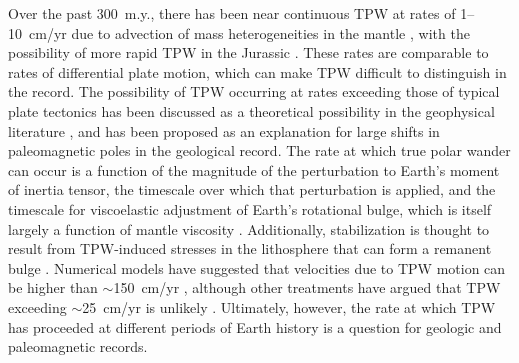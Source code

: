 Over the past 300~m.y., there has been near continuous TPW at rates of 1--10~cm/yr due to advection of mass heterogeneities in the mantle \citep{Steinberger2008a, Torsvik2012a}, with the possibility of more rapid TPW in the Jurassic \citep{Kent2015a}. These rates are comparable to rates of differential plate motion, which can make TPW difficult to distinguish in the record. The possibility of TPW occurring at rates exceeding those of typical plate tectonics has been discussed as a theoretical possibility in the geophysical literature \citep{Gold1955a, Fisher1974a, Steinberger1997a, Evans2003a}, and has been proposed as an explanation for large shifts in paleomagnetic poles in the geological record. The rate at which true polar wander can occur is a function of the magnitude of the perturbation to Earth's moment of inertia tensor, the timescale over which that perturbation is applied, and the timescale for viscoelastic adjustment of Earth's rotational bulge, which is itself largely a function of mantle viscosity \citep{Tsai2007a, Steinberger2010a, Creveling2012a}. Additionally, stabilization is thought to result from TPW-induced stresses in the lithosphere that can form a remanent bulge \citep{Ricard1993a, Chan2014a}. Numerical models have suggested that velocities due to TPW motion can be higher than $\sim$150~cm/yr \citep{Spada1992a}, although other treatments have argued that TPW exceeding $\sim$25~cm/yr is unlikely \citep{Tsai2007a}. Ultimately, however, the rate at which TPW has proceeded at different periods of Earth history is a question for geologic and paleomagnetic records.

